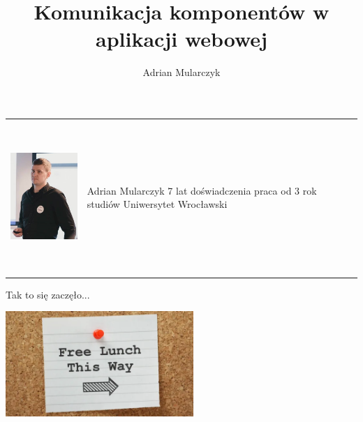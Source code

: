 \documentclass{beamer}
\title[]
{\Huge{Komunikacja komponentów w aplikacji webowej}}
\author[Adrian Mularczyk]{\Large{Adrian Mularczyk}}
\institute[PGS Software]
{
\small{PGS Software}
}
\date{}
\begin{document}
\begin{frame}
  \titlepage 
\end{frame}

\begin{frame}{}
	\begin{tabular}{ p{4.4cm} p{6cm} }
		\begin{minipage}{.4\textwidth}
			\begin{center}
  				\includegraphics[height=5cm]{ja.jpg}
			\end{center}
   		 \end{minipage}
   		 &
		\begin{minipage}{.7\textwidth}
  					\Huge{Adrian Mularczyk} \newline \newline
					\Large{7 lat doświadczenia} \newline
					\Large{praca od 3 rok studiów}\newline
					\Large{Uniwersytet Wrocławski}
   		 \end{minipage}
	\end{tabular}
\end{frame}

\begin{frame}{}
	\begin{center}
		\Huge{Tak to się zaczęło...}
	\end{center}
\end{frame}

\begin{frame}{}
	\begin{center}
  		\includegraphics[height=4cm]{lunch1.png}
	\end{center}
\end{frame}
\end{document}

